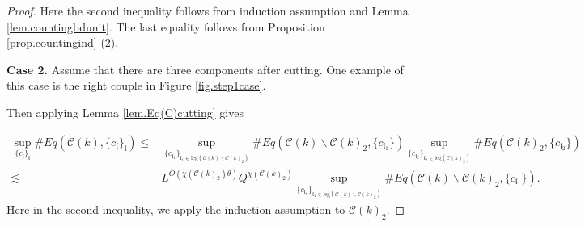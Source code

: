 \begin{proof}
Here the second inequality follows from induction assumption and Lemma \ref{lem.countingbdunit}. The last equality follows from Proposition \ref{prop.countingind} (2).


\textbf{Case 2.} Assume that there are three components after cutting. One example of this case is the right couple in Figure \ref{fig.step1case}.

Then applying Lemma \ref{lem.Eq(C)cutting} gives

\begin{equation}\label{eq.case2expand}
\begin{split}
    \sup_{\{c_{\mathfrak{l}}\}_{\mathfrak{l}}}\#Eq(\mathcal{C}(k),\{c_{\mathfrak{l}}\}_{\mathfrak{l}})\le&
    \sup_{\{c_{\mathfrak{l}_1}\}_{\mathfrak{l}_1\in \text{leg}(\mathcal{C}(k)\backslash\mathcal{C}(k)_2)} } \# Eq(\mathcal{C}(k)\backslash\mathcal{C}(k)_2,\{c_{\mathfrak{l}_1}\}) \sup_{\{c_{\mathfrak{l}_2}\}_{\mathfrak{l}_2\in \text{leg}(\mathcal{C}(k)_2)} }\# Eq(\mathcal{C}(k)_2, \{c_{\mathfrak{l}_2}\})
    \\
    \lesssim&  L^{O(\chi(\mathcal{C}(k)_2)\theta)} Q^{\chi(\mathcal{C}(k)_2)}\sup_{\{c_{\mathfrak{l}_1}\}_{\mathfrak{l}_1\in \text{leg}(\mathcal{C}(k)\backslash\mathcal{C}(k)_2)} } \# Eq(\mathcal{C}(k)\backslash\mathcal{C}(k)_2,\{c_{\mathfrak{l}_1}\}).
\end{split}
\end{equation}
Here in the second inequality, we apply the induction assumption to $\mathcal{C}(k)_2$.


\end{proof}
